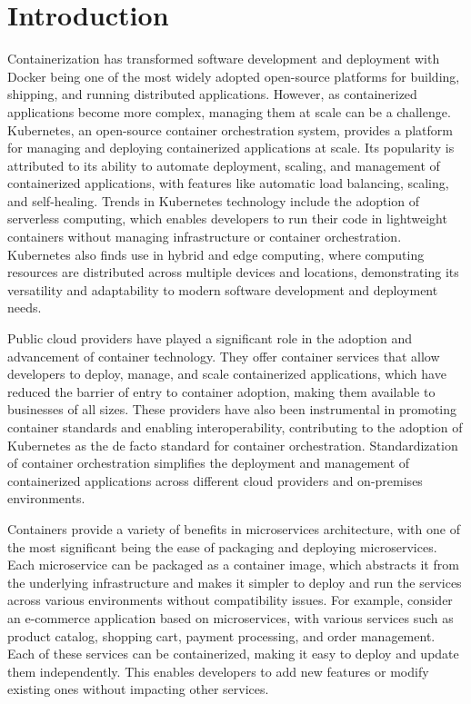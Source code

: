 \section{Introduction}
Containerization has transformed software development and deployment with Docker being one of the most widely adopted open-source platforms for building, shipping, and running distributed applications. However, as containerized applications become more complex, managing them at scale can be a challenge. Kubernetes, an open-source container orchestration system, provides a platform for managing and deploying containerized applications at scale. Its popularity is attributed to its ability to automate deployment, scaling, and management of containerized applications, with features like automatic load balancing, scaling, and self-healing. Trends in Kubernetes technology include the adoption of serverless computing, which enables developers to run their code in lightweight containers without managing infrastructure or container orchestration. Kubernetes also finds use in hybrid and edge computing, where computing resources are distributed across multiple devices and locations, demonstrating its versatility and adaptability to modern software development and deployment needs.


Public cloud providers have played a significant role in the adoption and advancement of container technology. They offer container services that allow developers to deploy, manage, and scale containerized applications, which have reduced the barrier of entry to container adoption, making them available to businesses of all sizes. These providers have also been instrumental in promoting container standards and enabling interoperability, contributing to the adoption of Kubernetes as the de facto standard for container orchestration. Standardization of container orchestration simplifies the deployment and management of containerized applications across different cloud providers and on-premises environments.


Containers provide a variety of benefits in microservices architecture, with one of the most significant being the ease of packaging and deploying microservices. Each microservice can be packaged as a container image, which abstracts it from the underlying infrastructure and makes it simpler to deploy and run the services across various environments without compatibility issues. For example, consider an e-commerce application based on microservices, with various services such as product catalog, shopping cart, payment processing, and order management. Each of these services can be containerized, making it easy to deploy and update them independently. This enables developers to add new features or modify existing ones without impacting other services.


